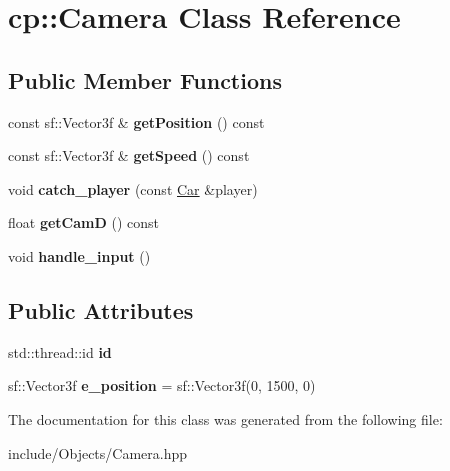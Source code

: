 \hypertarget{classcp_1_1_camera}{}\section{cp\+:\+:Camera Class Reference}
\label{classcp_1_1_camera}
\subsection*{Public Member Functions}
\begin{DoxyCompactItemize}
\item 
\mbox{\label{classcp_1_1_camera_af2cf800a9b18bbe6c07fb936b1b500e0}} 
const sf\+::\+Vector3f \& {\bfseries get\+Position} () const
\item 
\mbox{\label{classcp_1_1_camera_aedd15f99e37bd4a2290df292763f45e2}} 
const sf\+::\+Vector3f \& {\bfseries get\+Speed} () const
\item 
\mbox{\label{classcp_1_1_camera_a8cf1b15d3424f94e0fb944c40415f245}} 
void {\bfseries catch\+\_\+player} (const \hyperlink{classcp_1_1_car}{Car} \&player)
\item 
\mbox{\label{classcp_1_1_camera_a000634184a814ee273ab48bb50096438}} 
float {\bfseries get\+CamD} () const
\item 
\mbox{\label{classcp_1_1_camera_ac25389929c298ab44bec4b23c557ae44}} 
void {\bfseries handle\+\_\+input} ()
\end{DoxyCompactItemize}
\subsection*{Public Attributes}
\begin{DoxyCompactItemize}
\item 
\mbox{\label{classcp_1_1_camera_a6757f04379bd0a61dd20f1361685c5ef}} 
std\+::thread\+::id {\bfseries id}
\item 
\mbox{\label{classcp_1_1_camera_af65ba40e460d7fbfa946f8e8e0e08cab}} 
sf\+::\+Vector3f {\bfseries e\+\_\+position} = sf\+::\+Vector3f(0, 1500, 0)
\end{DoxyCompactItemize}


The documentation for this class was generated from the following file\+:\begin{DoxyCompactItemize}
\item 
include/\+Objects/Camera.\+hpp\end{DoxyCompactItemize}
